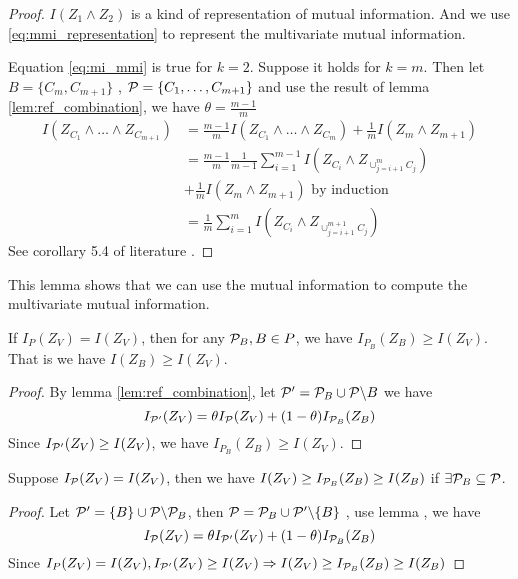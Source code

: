 \begin{proof}
\ifshowNonSelf
$I(Z_1 \wedge Z_2)$ is a kind of representation of mutual information.
And we use \eqref{eq:mmi_representation} to represent the multivariate mutual information.

Equation \eqref{eq:mi_mmi} is true for $k=2$. Suppose it holds for $k=m$. Then
let $B=\{C_m, C_{m+1}\}$ , $\P=\{C_1, \dots, C_{m+1}\}$
and use the result of lemma \ref{lem:ref_combination}, 
we have $\theta = \frac{m-1}{m}$
\begin{align*}
I(Z_{C_1} \wedge \dots \wedge Z_{C_{m+1}}) & = 
 \frac{m-1}{m} I(Z_{C_1} \wedge \dots \wedge Z_{C_m})
+ \frac{1}{m}  I(Z_{m} \wedge Z_{m+1}) \\
& = \frac{m-1}{m} \frac{1}{m-1}\sum_{i=1}^{m-1} I(Z_{C_i} \wedge Z_{\cup_{j=i+1}^m C_j})\\
& + \frac{1}{m}  I(Z_{m} \wedge Z_{m+1})\textrm{ by induction} \\
& = \frac{1}{m} \sum_{i=1}^{m} I(Z_{C_i} \wedge Z_{\cup_{j=i+1}^{m+1} C_j})
\end{align*}
\else
See corollary 5.4 of literature \cite{ska}.
\fi
\end{proof}
\begin{remark}
This lemma shows that we can use the mutual information to compute the multivariate mutual information.
\end{remark}
\begin{lemma}\label{lem:elementLarge}
If $I_{P}(Z_V) = I(Z_V)$, then for any $\P_B, B\in P$, we have $I_{P_B}(Z_B) \geq I(Z_V)$. 
That is we have $I(Z_B) \geq I(Z_V)$.
\end{lemma}
\begin{proof}
By lemma \ref{lem:ref_combination}, let $\P' = \P_B \cup \P\backslash B$ we have 
\begin{equation}
I_{\P'}(Z_V) = \theta I_{\P}(Z_V) + (1-\theta) I_{\P_B}(Z_B)
\end{equation}
Since $I_{\P'}(Z_V)\geq I(Z_V)$, we have $I_{P_B}(Z_B) \geq I(Z_V)$.
\end{proof}
\begin{lemma}\label{lem:smallZB}
Suppose $I_{\P}(Z_V) = I(Z_V)$, then we have $I(Z_V) \geq I_{\P_B}(Z_B) \geq I(Z_B)$ if $\exists \P_B \subseteq \P$.
\end{lemma}
\begin{proof}
Let $\P' = \{B\} \cup \P\backslash \P_B$, then $\P = \P_B \cup \P'\backslash\{B\}$ , use lemma , we have
\begin{equation}
I_{\P}(Z_V) = \theta I_{\P'}(Z_V) + (1-\theta) I_{\P_B}(Z_B)
\end{equation}
Since  $I_{P}(Z_V) = I(Z_V), I_{\P'}(Z_V)\geq I(Z_V) \Rightarrow I(Z_V) \geq I_{\P_B}(Z_B) \geq I(Z_B)$ 
\end{proof}
